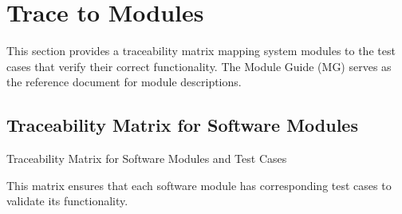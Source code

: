 \documentclass[12pt, titlepage]{article}
\begin{document}
\begin{table}[h!]
        \centering
        \end{table}


\pagebreak

\section{Trace to Modules}		
This section provides a traceability matrix mapping system modules to the test cases that verify their correct functionality. The Module Guide (MG) serves as the reference document for module descriptions.

\subsection{Traceability Matrix for Software Modules}
Traceability Matrix for Software Modules and Test Cases

This matrix ensures that each software module has corresponding test cases to validate its functionality.
\end{document}
